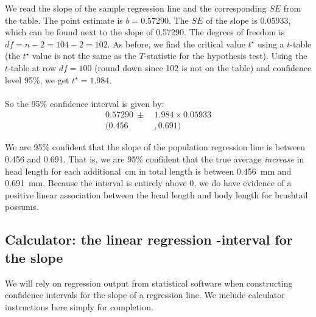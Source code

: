 \begin{examplewrap}
\begin{nexample}
\begin{description}
We read the slope of the sample regression line and the corresponding $SE$ from the table.  The point estimate is $b = 0.57290$.  The $SE$ of the slope is 0.05933, which can be found next to the slope of 0.57290.  The degrees of freedom is $df=n-2=104-2=102$.  As before, we find the critical value $t^{\star}$ using a $t$-table (the $t^{\star}$ value is not the same as the $T$-statistic for the hypothesis test).   Using the $t$-table at row $df = 100$ (round down since 102 is not on the table) and confidence level 95\%, we get $t^{\star}=1.984$.  
\\
\\
So the 95\% confidence interval is given by:
\begin{align*}
0.57290 \ \pm\  &1.984\times  0.05933\\
 (0.456&, 0.691)
\end{align*}
\item[\inferencestep{Conclude}]  We are 95\% confident that the slope of the population regression line is between 0.456 and 0.691.  That is, we are 95\% confident that the true average \emph{increase} in head length for each additional~cm in total length is between 0.456~mm and 0.691~mm.  Because the interval is entirely above 0, we do have evidence of a positive linear association between the head length and body length for brushtail possums.  
\end{description}


\end{nexample}
\end{examplewrap}



\D{\newpage}

\subsection[Calculator: the $t$-interval for the slope]{Calculator: the linear regression -interval for the slope}
We will rely on regression output from statistical software when constructing confidence intervals for the slope of a regression line.  We include calculator instructions here simply for completion.

